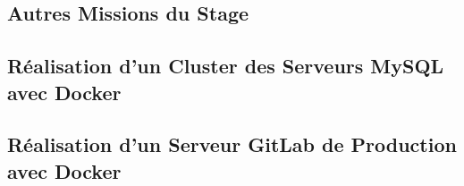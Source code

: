 \begin{appendices}

\chapter{Autres Missions du Stage}

\section{Réalisation d'un Cluster des Serveurs MySQL avec Docker}

\section{Réalisation d'un Serveur GitLab de Production avec Docker}

\end{appendices}
